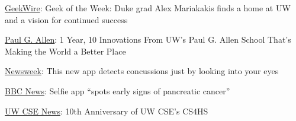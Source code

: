 \href{https://www.geekwire.com/2017/alex-mariakakis/}{GeekWire}: Geek of the Week: Duke grad Alex Mariakakis finds a home at UW and a vision for continued success 

\href{https://www.paulallen.com/1-year-10-innovations-from-uws-paul-g-allen-school-thats-making-the-world-a-better-place/}{Paul G. Allen}: 1 Year, 10 Innovations From UW's Paul G. Allen School That's Making the World a Better Place

\href{http://www.newsweek.com/new-app-detects-concussions-just-looking-your-eyes-663218}{Newsweek}: This new app detects concussions just by looking into your eyes

\href{http://www.bbc.com/news/av/technology-41114587/selfie-app-spots-early-signs-of-pancreatic-cancer}{BBC News}: Selfie app ``spots early signs of pancreatic cancer''

\href{https://news.cs.washington.edu/2016/07/10/10th-anniversary-of-uw-cses-cs4hs/}{UW CSE News}: 10th Anniversary of UW CSE's CS4HS